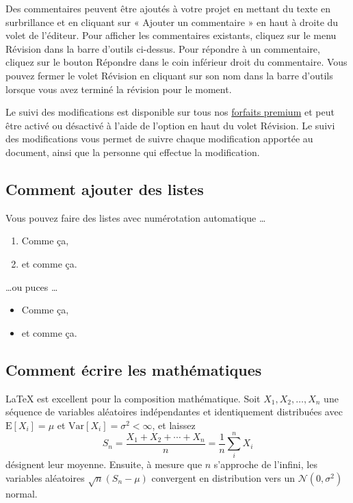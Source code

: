 \documentclass{article}
\begin{document}
Des commentaires peuvent être ajoutés à votre projet en mettant du texte en surbrillance et en cliquant sur « Ajouter un commentaire » en haut à droite du volet de l'éditeur. Pour afficher les commentaires existants, cliquez sur le menu Révision dans la barre d'outils ci-dessus. Pour répondre à un commentaire, cliquez sur le bouton Répondre dans le coin inférieur droit du commentaire. Vous pouvez fermer le volet Révision en cliquant sur son nom dans la barre d'outils lorsque vous avez terminé la révision pour le moment.

Le suivi des modifications est disponible sur tous nos \href{https://www.overleaf.com/user/subscription/plans}{forfaits premium} et peut être activé ou désactivé à l'aide de l'option en haut du volet Révision. Le suivi des modifications vous permet de suivre chaque modification apportée au document, ainsi que la personne qui effectue la modification.

\subsection{Comment ajouter des listes}

Vous pouvez faire des listes avec numérotation automatique \dots

\begin{enumerate}
\item Comme ça,
\item et comme ça.
\end{enumerate}
\dots ou puces \dots
\begin{itemize}
\item Comme ça,
\item et comme ça.
\end{itemize}

\subsection{Comment écrire les mathématiques}

\LaTeX{} est excellent pour la composition mathématique. Soit $X_1, X_2, \ldots, X_n$ une séquence de variables aléatoires indépendantes et identiquement distribuées avec $\text{E}[X_i] = \mu$ et $\text{Var}[X_i] = \sigma^2 < \infty$, et laissez
\[S_n = \frac{X_1 + X_2 + \cdots + X_n}{n}
       = \frac{1}{n}\sum_{i}^{n} X_i\]
désignent leur moyenne. Ensuite, à mesure que $n$ s'approche de l'infini, les variables aléatoires $\sqrt{n}(S_n - \mu)$ convergent en distribution vers un $\mathcal{N}(0, \sigma^2)$ normal.
\end{document}
